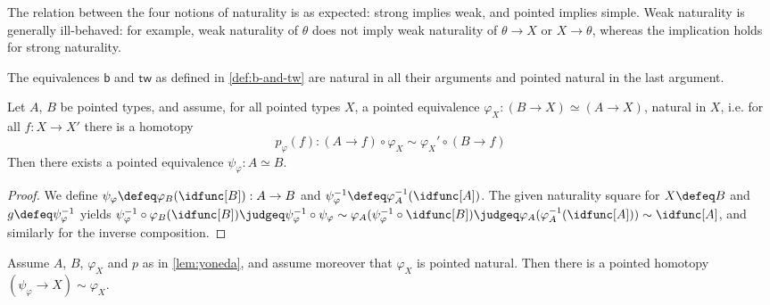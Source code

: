 \documentclass{article}
\renewcommand{\phi}{\varphi}
\renewcommand{\o}{\ensuremath{\circ}}
\newcommand{\sy}{^{-1}}
\newcommand{\two}{\mathsf{b}}
\newcommand{\twist}{\mathsf{tw}}
\begin{document}
\begin{rmk}
	The relation between the four notions of naturality is as expected: strong implies weak, and pointed implies simple. Weak naturality is generally ill-behaved: for example, weak naturality of $\theta$ does not imply weak naturality of $\theta \to X$ or $X \to \theta$, whereas the implication holds for strong naturality.
\end{rmk}

\begin{rmk}
	The equivalences $\two$ and $\twist$ as defined in \autoref{def:b-and-tw} are natural in all their arguments and pointed natural in the last argument.
\end{rmk}

\begin{lem}[Yoneda]\label{lem:yoneda}
	Let $A$, $B$ be pointed types, and assume, for all pointed types $X$, a pointed equivalence $\phi_X : (B \to X) \simeq (A \to X)$, natural in $X$, i.e. for all $f : X \to X'$ there is a homotopy \[ p_\phi(f) : (A \to f) \o \phi_X \sim \phi_X' \o (B \to f) \]
	Then there exists a pointed equivalence $\psi_\phi : A \simeq B$.
\end{lem}
\begin{proof}
	We define $\psi_\phi \defeq \phi_B(\idfunc[B]) : A \to B$ and $\psi_\phi\sy \defeq \phi_A\sy(\idfunc[A])$. The given naturality square for $X \defeq B$ and $g \defeq \psi_\phi\sy$ yields $\psi_\phi\sy \o \phi_B (\idfunc[B]) \judgeq \psi_\phi\sy \o \psi_\phi \sim \phi_A (\psi_\phi\sy \o \idfunc[B]) \judgeq \phi_A (\phi_A\sy (\idfunc[A])) \sim \idfunc[A]$, and similarly for the inverse composition.
\end{proof}

\begin{lem}\label{lem:yoneda-pointed}
	Assume $A$, $B$, $\phi_X$ and $p$ as in \autoref{lem:yoneda}, and assume moreover that $\phi_X$ is pointed natural. Then there is a pointed homotopy $(\psi_\phi \to X) \sim \phi_X$.
\end{lem}
\end{document}
